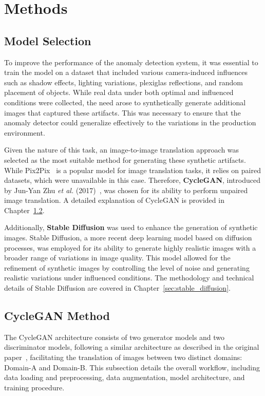 \documentclass[12pt,DIV14,BCOR12mm,a4paper,footinclude=false,headinclude,parskip=half-,twoside,openright,cleardoublepage=empty,toc=index,bibliography=totoc,listof=totoc]{scrreprt}
\numberwithin{equation}{chapter}
\begin{document}
\section{Methods}
\subsection{Model Selection}
To improve the performance of the anomaly detection system, it was essential to train the model on a dataset that included various camera-induced influences such as shadow effects, lighting variations, plexiglas reflections, and random placement of objects. While real data under both optimal and influenced conditions were collected, the need arose to synthetically generate additional images that captured these artifacts. This was necessary to ensure that the anomaly detector could generalize effectively to the variations in the production environment.

Given the nature of this task, an image-to-image translation approach was selected as the most suitable method for generating these synthetic artifacts. While Pix2Pix~\cite{isola2017image} is a popular model for image translation tasks, it relies on paired datasets, which were unavailable in this case. Therefore, \textbf{CycleGAN}, introduced by Jun-Yan Zhu \textit{et al.} (2017)~\cite{zhu2017unpaired}, was chosen for its ability to perform unpaired image translation. A detailed explanation of CycleGAN is provided in Chapter~\ref{sec:cyclegan}.

Additionally, \textbf{Stable Diffusion} was used to enhance the generation of synthetic images. Stable Diffusion, a more recent deep learning model based on diffusion processes, was employed for its ability to generate highly realistic images with a broader range of variations in image quality. This model allowed for the refinement of synthetic images by controlling the level of noise and generating realistic variations under influenced conditions. The methodology and technical details of Stable Diffusion are covered in Chapter~\ref{sec:stable_diffusion}.
\subsection{CycleGAN Method}
\label{sec:cyclegan}
The CycleGAN architecture consists of two generator models and two discriminator models, following a similar architecture as described in the original paper~\cite{zhu2017unpaired}, facilitating the translation of images between two distinct domains: Domain-A and Domain-B. This subsection details the overall workflow, including data loading and preprocessing, data augmentation, model architecture, and training procedure.
\end{document}
